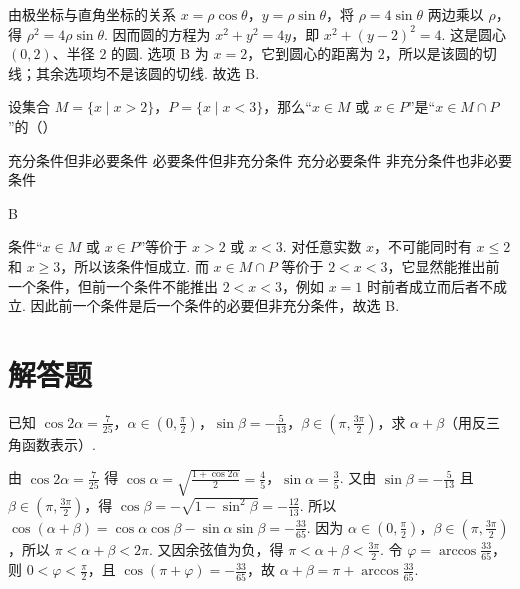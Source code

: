 \documentclass[UTF8,a4paper,oneside,11pt]{ctexbook}
\begin{document}
\begin{solution}
由极坐标与直角坐标的关系 \(x=\rho\cos\theta\)，\(y=\rho\sin\theta\)，将 \(\rho=4\sin\theta\) 两边乘以 \(\rho\)，得 \(\rho^2=4\rho\sin\theta\). 因而圆的方程为 \(x^2+y^2=4y\)，即 \(x^2+(y-2)^2=4\). 这是圆心 \((0,2)\)、半径 \(2\) 的圆. 选项 B 为 \(x=2\)，它到圆心的距离为 \(2\)，所以是该圆的切线；其余选项均不是该圆的切线. 故选 B.
\end{solution}

\begin{problem}
设集合 \(M = \{x \mid x > 2\}\)，\(P = \{x \mid x < 3\}\)，那么“\(x \in M\) 或 \(x \in P\)”是“\(x \in M \cap P\)”的（\quad）

\choices
    {充分条件但非必要条件}
    {必要条件但非充分条件}
    {充分必要条件}
    {非充分条件也非必要条件}
\end{problem}

\begin{answer}
B
\end{answer}

\begin{solution}
条件“\(x\in M\) 或 \(x\in P\)”等价于 \(x>2\) 或 \(x<3\). 对任意实数 \(x\)，不可能同时有 \(x\leqslant2\) 和 \(x\geqslant3\)，所以该条件恒成立. 而 \(x\in M\cap P\) 等价于 \(2<x<3\)，它显然能推出前一个条件，但前一个条件不能推出 \(2<x<3\)，例如 \(x=1\) 时前者成立而后者不成立. 因此前一个条件是后一个条件的必要但非充分条件，故选 B.
\end{solution}

\section{解答题}

\begin{problem}
已知 \(\cos 2\alpha = \frac{7}{25}\)，\(\alpha \in \left(0, \frac{\pi}{2}\right)\)，\(\sin \beta = -\frac{5}{13}\)，\(\beta \in \left(\pi, \frac{3\pi}{2}\right)\)，求 \(\alpha + \beta\)（用反三角函数表示）.
\end{problem}

\begin{solution}
由 \(\cos 2\alpha = \frac{7}{25}\) 得 \(\cos \alpha = \sqrt{\frac{1 + \cos 2\alpha}{2}} = \frac{4}{5}\)，\(\sin \alpha = \frac{3}{5}\). 又由 \(\sin \beta = -\frac{5}{13}\) 且 \(\beta \in \left(\pi,\frac{3\pi}{2}\right)\)，得 \(\cos \beta = -\sqrt{1 - \sin^2 \beta} = -\frac{12}{13}\). 所以 \(\cos(\alpha + \beta) = \cos \alpha \cos \beta - \sin \alpha \sin \beta = -\frac{33}{65}\). 因为 \(\alpha\in\left(0,\frac{\pi}{2}\right)\)，\(\beta\in\left(\pi,\frac{3\pi}{2}\right)\)，所以 \(\pi<\alpha+\beta<2\pi\). 又因余弦值为负，得 \(\pi<\alpha+\beta<\frac{3\pi}{2}\). 令 \(\varphi=\arccos\frac{33}{65}\)，则 \(0<\varphi<\frac{\pi}{2}\)，且 \(\cos(\pi+\varphi)=-\frac{33}{65}\)，故 \(\alpha+\beta=\pi+\arccos\frac{33}{65}\).
\end{solution}
\end{document}
